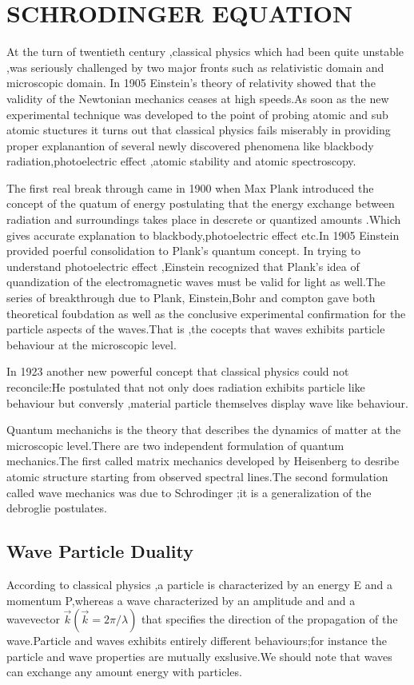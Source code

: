 \chapter{SCHRODINGER EQUATION}
 At the turn of twentieth century ,classical physics which had been quite unstable ,was seriously challenged by two major fronts such as relativistic domain and microscopic domain. In 1905 Einstein's theory of relativity showed that the validity of the Newtonian mechanics ceases at high speeds.As soon as the new experimental technique was developed to the point of probing atomic and sub atomic stuctures it turns out that classical physics fails miserably in providing proper explanantion of several newly discovered phenomena like blackbody radiation,photoelectric effect ,atomic stability and atomic spectroscopy.
  \par The first real break through came in 1900 when Max Plank introduced the concept of the quatum of energy postulating that the energy exchange between radiation and surroundings takes place in descrete or quantized amounts .Which gives accurate explanation to blackbody,photoelectric effect etc.In 1905 Einstein provided poerful consolidation to Plank's quantum concept. In trying to understand photoelectric effect ,Einstein recognized that Plank's idea of quandization of the electromagnetic waves must be valid for light as well.The series of breakthrough due to Plank, Einstein,Bohr and compton gave both theoretical foubdation as well as the conclusive experimental confirmation for the particle aspects of the waves.That is ,the cocepts that waves exhibits particle behaviour at the microscopic level.
  \par In 1923 another new powerful concept that classical physics could not reconcile:He postulated that not only does radiation exhibits particle like behaviour but conversly ,material particle themselves display wave like behaviour.
  \par Quantum mechanichs is the theory that describes the dynamics of matter at the microscopic level.There are two independent formulation of quantum mechanics.The first called matrix mechanics developed by Heisenberg to desribe atomic structure starting from observed spectral lines.The second formulation called wave mechanics was due to Schrodinger ;it is a generalization of the debroglie postulates.
  \section{Wave Particle Duality}
    According to classical physics ,a particle is characterized by an energy E and a momentum P,whereas a wave characterized by an amplitude and and a wavevector $\vec{k}(\vec{k}=2\pi/\lambda)$ that specifies the direction of the propagation of the wave.Particle and waves exhibits entirely different behaviours;for instance the particle and wave properties are mutually exslusive.We should note that waves can exchange any amount energy with particles.
